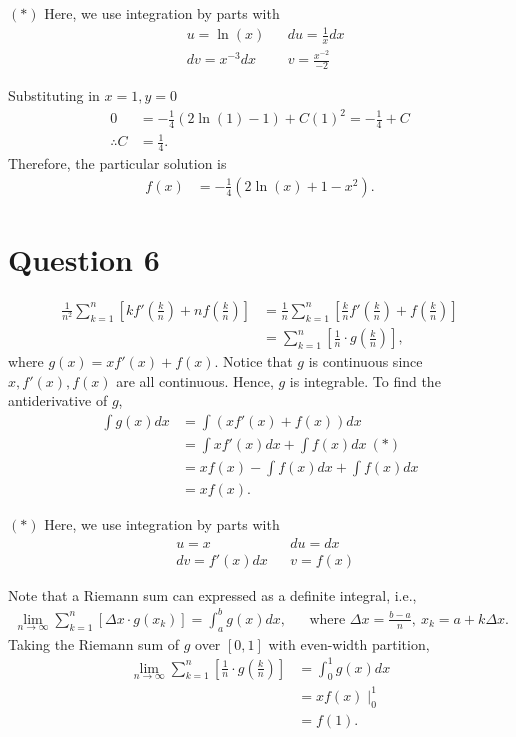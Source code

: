 \documentclass[12pt]{article}
\begin{document}
$(*)$ Here, we use integration by parts with
\begin{align*}
    & u=\ln(x)      && du=\frac{1}{x}dx \\
    & dv=x^{-3}dx   && v=\frac{x^{-2}}{-2}
\end{align*}

Substituting in $x=1,y=0$
\begin{align*}
    0 &= -\frac{1}{4}(2\ln(1)-1)+C(1)^2= -\frac{1}{4}+C\\
    \therefore C &= \frac{1}{4}.
\end{align*}
Therefore, the particular solution is
\begin{align*}
    f(x) &= -\frac{1}{4}(2\ln(x)+1-x^2).  
\end{align*}

\newpage
\section*{Question 6}
\begin{align*}
    \frac{1}{n^2}\sum_{k=1}^n\left[kf'\left(\frac{k}{n}\right)+nf\left(\frac{k}{n}\right)\right] &= \frac{1}{n}\sum_{k=1}^n\left[\frac{k}{n}f'\left(\frac{k}{n}\right)+f\left(\frac{k}{n}\right)\right]\\
    &= \sum_{k=1}^n\left[\frac{1}{n}\cdot g\left(\frac{k}{n}\right)\right],
\end{align*}
where $g(x) = xf'(x)+f(x)$. Notice that $g$ is continuous since $x, f'(x), f(x)$ are all continuous. Hence, $g$ is integrable. To find the antiderivative of $g$, 
\begin{align*}
    \int g(x) dx &= \int \left(xf'(x) + f(x)\right) dx\\
    &= \int xf'(x) dx + \int f(x) dx\:(*)\\
    &= xf(x) - \int f(x) dx + \int f(x) dx\\
    &= xf(x).
\end{align*}

$(*)$ Here, we use integration by parts with
\begin{align*}
    & u=x           && du=dx \\
    & dv=f'(x)dx    && v=f(x)
\end{align*}    

Note that a Riemann sum can expressed as a definite integral, i.e.,
\begin{align*}
    \lim_{n\to\infty}\sum_{k=1}^n\left[\Delta x \cdot g(x_k)\right]=\int_a^b g(x)dx, 
    && \text{where }\Delta x=\frac{b-a}{n},\: x_k=a+k\Delta x.
\end{align*}
Taking the Riemann sum of $g$ over $[0,1]$ with even-width partition,
\begin{align*}
    \lim_{n\to\infty}\sum_{k=1}^n\left[\frac{1}{n}\cdot g\left(\frac{k}{n}\right)\right] &= \int_0^1 g(x)dx\\
    &= xf(x)\mid_0^1\\
    &= f(1).
\end{align*}
\end{document}
